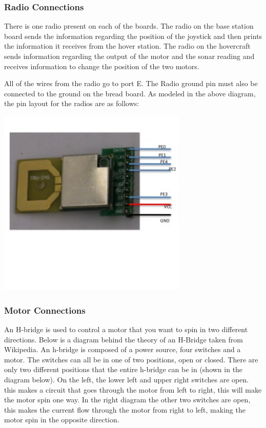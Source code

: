 \subsubsection{Radio Connections}
\label{radioconn}

There is one radio present on each of the boards. The radio on the base station board sends the information regarding the position of the joystick and then prints the information it receives from the hover station.  The radio on the hovercraft sends information regarding the output of the motor and the sonar reading and receives information to change the position of the two motors.

All of the wires from the radio go to port E. The Radio ground pin must also be connected to the ground on the bread board. As modeled in the above diagram, the pin layout for the radios are as follows:

  \begin{center}
    \includegraphics[width=90mm]{imageSources/radioConnect.png}
  \end{center}
  \label{radioConnect}


\subsubsection{Motor Connections}
An H-bridge is used to  control a motor that you want to spin in two different directions. Below is a diagram behind the theory of an H-Bridge taken from Wikipedia. An h-bridge is composed of a power source, four switches and a motor. The switches can all be in one of two positions, open or closed. There are only two different positions that the entire h-bridge can be in (shown in the diagram below). On the left, the lower left and upper right switches are open. this makes a circuit that goes through the motor from left to right, this will make the motor spin one way.  In the right diagram the other two switches are open, this makes the current flow through the motor from right to left, making the motor spin in the opposite direction.

